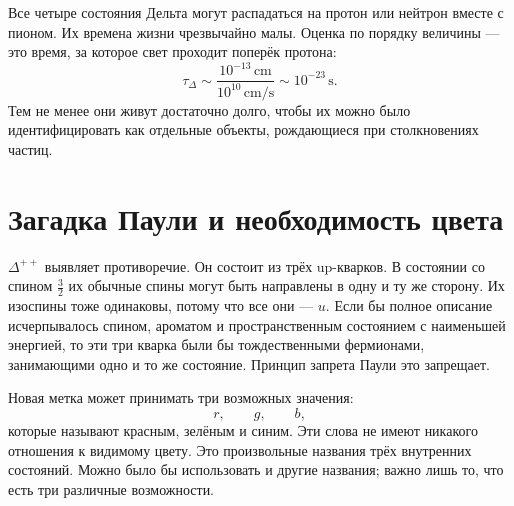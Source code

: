 Все четыре состояния Дельта могут распадаться на протон или нейтрон вместе с пионом. Их времена жизни чрезвычайно малы. Оценка по порядку величины — это время, за которое свет проходит поперёк протона:
\begin{equation}
\tau_\Delta
\sim
\frac{10^{-13}\,\mathrm{cm}}
     {10^{10}\,\mathrm{cm/s}}
\sim10^{-23}\,\mathrm{s}.
\end{equation}
Тем не менее они живут достаточно долго, чтобы их можно было идентифицировать как отдельные объекты, рождающиеся при столкновениях частиц.

\begin{classroomqa}
\end{classroomqa}

\section{Загадка Паули и необходимость цвета}

\(\Delta^{++}\) выявляет противоречие. Он состоит из трёх up-кварков. В состоянии со спином \(\tfrac32\) их обычные спины могут быть направлены в одну и ту же сторону. Их изоспины тоже одинаковы, потому что все они — \(u\). Если бы полное описание исчерпывалось спином, ароматом и пространственным состоянием с наименьшей энергией, то эти три кварка были бы тождественными фермионами, занимающими одно и то же состояние. Принцип запрета Паули это запрещает.

\begin{classroomqa}
\end{classroomqa}

Новая метка может принимать три возможных значения:
\begin{equation}
r,\qquad g,\qquad b,
\end{equation}
которые называют красным, зелёным и синим. Эти слова не имеют никакого отношения к видимому цвету. Это произвольные названия трёх внутренних состояний. Можно было бы использовать и другие названия; важно лишь то, что есть три различные возможности.

